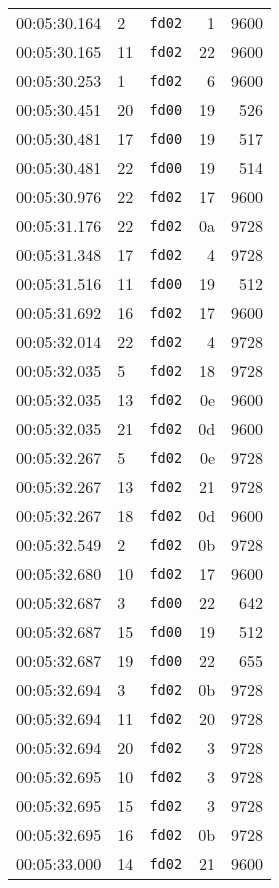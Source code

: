 \documentclass{article}
\begin{document}
\begin{longtable}{lllrr}
00:05:30.164 & 2 & \texttt{fd02} & 1 & 9600 \\
00:05:30.165 & 11 & \texttt{fd02} & 22 & 9600 \\
00:05:30.253 & 1 & \texttt{fd02} & 6 & 9600 \\
00:05:30.451 & 20 & \texttt{fd00} & 19 & 526 \\
00:05:30.481 & 17 & \texttt{fd00} & 19 & 517 \\
00:05:30.481 & 22 & \texttt{fd00} & 19 & 514 \\
00:05:30.976 & 22 & \texttt{fd02} & 17 & 9600 \\
00:05:31.176 & 22 & \texttt{fd02} & 0a & 9728 \\
00:05:31.348 & 17 & \texttt{fd02} & 4 & 9728 \\
00:05:31.516 & 11 & \texttt{fd00} & 19 & 512 \\
00:05:31.692 & 16 & \texttt{fd02} & 17 & 9600 \\
00:05:32.014 & 22 & \texttt{fd02} & 4 & 9728 \\
00:05:32.035 & 5 & \texttt{fd02} & 18 & 9728 \\
00:05:32.035 & 13 & \texttt{fd02} & 0e & 9600 \\
00:05:32.035 & 21 & \texttt{fd02} & 0d & 9600 \\
00:05:32.267 & 5 & \texttt{fd02} & 0e & 9728 \\
00:05:32.267 & 13 & \texttt{fd02} & 21 & 9728 \\
00:05:32.267 & 18 & \texttt{fd02} & 0d & 9600 \\
00:05:32.549 & 2 & \texttt{fd02} & 0b & 9728 \\
00:05:32.680 & 10 & \texttt{fd02} & 17 & 9600 \\
00:05:32.687 & 3 & \texttt{fd00} & 22 & 642 \\
00:05:32.687 & 15 & \texttt{fd00} & 19 & 512 \\
00:05:32.687 & 19 & \texttt{fd00} & 22 & 655 \\
00:05:32.694 & 3 & \texttt{fd02} & 0b & 9728 \\
00:05:32.694 & 11 & \texttt{fd02} & 20 & 9728 \\
00:05:32.694 & 20 & \texttt{fd02} & 3 & 9728 \\
00:05:32.695 & 10 & \texttt{fd02} & 3 & 9728 \\
00:05:32.695 & 15 & \texttt{fd02} & 3 & 9728 \\
00:05:32.695 & 16 & \texttt{fd02} & 0b & 9728 \\
00:05:33.000 & 14 & \texttt{fd02} & 21 & 9600 \\

\end{longtable}
\end{document}
